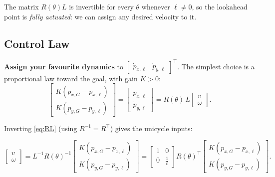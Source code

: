 \documentclass[../../master-handout.tex]{subfiles}
\begin{document}
The matrix $R(\theta) L$ is invertible for every $\theta$ whenever
$\ell \neq 0$, so the lookahead point is \emph{fully actuated}: we can assign
any desired velocity to it.

\subsection{Control Law}

\textbf{Assign your favourite dynamics} to
$\begin{bmatrix} \dot{p}_{x,\ell} & \dot{p}_{y,\ell} \end{bmatrix}^\top$. The
simplest choice is a proportional law toward the goal, with gain $K > 0$:
\begin{equation}
    \begin{bmatrix}
        K \left(p_{x,G} - p_{x,\ell}\right) \\
        K \left(p_{y,G} - p_{y,\ell}\right)
    \end{bmatrix}
    =
    \begin{bmatrix} \dot{p}_{x,\ell} \\ \dot{p}_{y,\ell} \end{bmatrix}
    = R(\theta) \, L \begin{bmatrix} v \\ \omega \end{bmatrix}.
\end{equation}

Inverting \eqref{eq:RL} (using $R^{-1} = R^\top$) gives the unicycle inputs:
\begin{fullwidth}
\begin{equation}
    \begin{bmatrix} v \\ \omega \end{bmatrix}
    = L^{-1} R(\theta)^{-1}
    \begin{bmatrix}
        K \left(p_{x,G} - p_{x,\ell}\right) \\
        K \left(p_{y,G} - p_{y,\ell}\right)
    \end{bmatrix}
    =
    \begin{bmatrix} 1 & 0 \\ 0 & \frac{1}{\ell} \end{bmatrix}
    R(\theta)^\top
    \begin{bmatrix}
        K \left(p_{x,G} - p_{x,\ell}\right) \\
        K \left(p_{y,G} - p_{y,\ell}\right)
    \end{bmatrix}.
    \label{eq:control}
\end{equation}
\end{fullwidth}
\end{document}
